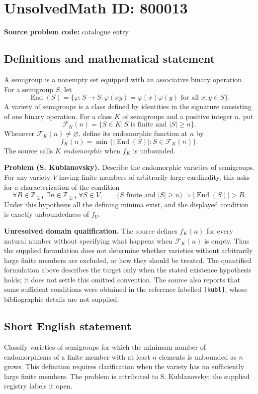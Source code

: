 \documentclass[11pt]{article}
\newcommand{\Z}{\mathbb{Z}}
\begin{document}
\section*{UnsolvedMath ID: 800013}
\textbf{Source problem code:} catalogue entry
\subsection{Definitions and mathematical statement}
A semigroup is a nonempty set equipped with an associative binary operation. For a semigroup \(S\), let
\[
\operatorname{End}(S)=\{\varphi:S\to S: \varphi(xy)=\varphi(x)\varphi(y)\text{ for all }x,y\in S\}.
\]
A variety of semigroups is a class defined by identities in the signature consisting of one binary operation. For a class \(K\) of semigroups and a positive integer \(n\), put
\[
\mathcal F_K(n)=\{S\in K:S\text{ is finite and }|S|\ge n\}.
\]
Whenever \(\mathcal F_K(n)\ne\varnothing\), define its endomorphic function at \(n\) by
\[
f_K(n)=\min\{|\operatorname{End}(S)|:S\in\mathcal F_K(n)\}.
\]
The source calls \(K\) \emph{endomorphic} when \(f_K\) is unbounded.

\textbf{Problem (S. Kublanovsky).} Describe the endomorphic varieties of semigroups. For any variety \(V\) having finite members of arbitrarily large cardinality, this asks for a characterization of the condition
\[
\forall B\in\Z_{\ge0}\ \exists n\in\Z_{\ge1}\ \forall S\in V,\qquad
\bigl(S\text{ finite and }|S|\ge n\bigr)
\Longrightarrow |\operatorname{End}(S)|>B.
\]
Under this hypothesis all the defining minima exist, and the displayed condition is exactly unboundedness of \(f_V\).

\textbf{Unresolved domain qualification.} The source defines \(f_K(n)\) for every natural number without specifying what happens when \(\mathcal F_K(n)\) is empty. Thus the supplied formulation does not determine whether varieties without arbitrarily large finite members are excluded, or how they should be treated. The quantified formulation above describes the target only when the stated existence hypothesis holds; it does not settle this omitted convention. The source also reports that some sufficient conditions were obtained in the reference labelled \texttt{[kubl]}, whose bibliographic details are not supplied.
\subsection{Short English statement}
Classify varieties of semigroups for which the minimum number of endomorphisms of a finite member with at least \(n\) elements is unbounded as \(n\) grows. This definition requires clarification when the variety has no sufficiently large finite members. The problem is attributed to S. Kublanovsky; the supplied registry labels it open.
\end{document}
